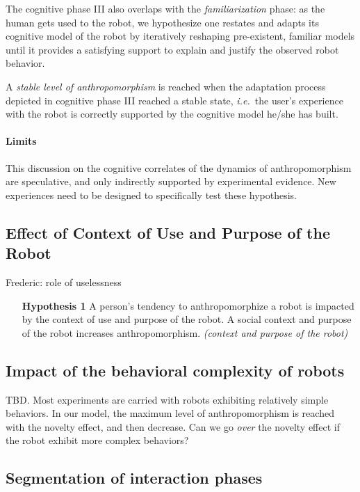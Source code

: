 \documentclass{frontiersSCNS} %
\newcommand{\ie}{{\textit{i.e.~}}}
\begin{document}
The cognitive phase III also overlaps with the \emph{familiarization} phase: as
the human gets used to the robot, we hypothesize one restates and adapts its
cognitive model of the robot by iteratively reshaping pre-existent, familiar
models until it provides a satisfying support to explain and justify the
observed robot behavior.

A \emph{stable level of anthropomorphism} is reached when the adaptation process
depicted in cognitive phase III reached a stable state, \ie the user's
experience with the robot is correctly supported by the cognitive model he/she
has built.

\paragraph{Limits} This discussion on the cognitive correlates of the dynamics
of anthropomorphism are speculative, and only indirectly supported by
experimental evidence. New experiences need to be designed to specifically test
these hypothesis.

\subsection{Effect of Context of Use and Purpose of the Robot}
\label{sec:8.1}
Frederic: role of uselessness


\begin{itemize}
    \item[\textbf{Hypothesis 1}] A person's tendency to anthropomorphize a robot
        is impacted by the context of use and purpose of the robot. A social
        context and purpose of the robot increases anthropomorphism.
        \textit{(context and purpose of the robot)}

\end{itemize}

\subsection{Impact of the behavioral complexity of robots}

TBD. Most experiments are carried with robots exhibiting relatively simple
behaviors. In our model, the maximum level of anthropomorphism is reached with
the novelty effect, and then decrease. Can we go \emph{over} the novelty effect
if the robot exhibit more complex behaviors?

\subsection{Segmentation of interaction phases}
\end{document}

